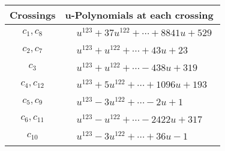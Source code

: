 \documentclass[1p]{elsarticle_modified}
\theoremstyle{definition}
\begin{document}
\begin{tabular}{m{50pt}|m{274pt}}
Crossings & \hspace{64pt}u-Polynomials at each crossing \\
\hline $$\begin{aligned}c_{1},c_{8}\end{aligned}$$&$\begin{aligned}
&u^{123}+37 u^{122}+\cdots+8841 u+529
\end{aligned}$\\
\hline $$\begin{aligned}c_{2},c_{7}\end{aligned}$$&$\begin{aligned}
&u^{123}+u^{122}+\cdots+43 u+23
\end{aligned}$\\
\hline $$\begin{aligned}c_{3}\end{aligned}$$&$\begin{aligned}
&u^{123}+u^{122}+\cdots-438 u+319
\end{aligned}$\\
\hline $$\begin{aligned}c_{4},c_{12}\end{aligned}$$&$\begin{aligned}
&u^{123}+5 u^{122}+\cdots+1096 u+193
\end{aligned}$\\
\hline $$\begin{aligned}c_{5},c_{9}\end{aligned}$$&$\begin{aligned}
&u^{123}-3 u^{122}+\cdots-2 u+1
\end{aligned}$\\
\hline $$\begin{aligned}c_{6},c_{11}\end{aligned}$$&$\begin{aligned}
&u^{123}- u^{122}+\cdots-2422 u+317
\end{aligned}$\\
\hline $$\begin{aligned}c_{10}\end{aligned}$$&$\begin{aligned}
&u^{123}-3 u^{122}+\cdots+36 u-1
\end{aligned}$\\
\hline
\end{tabular}\\~\\
\newpage\renewcommand{\arraystretch}{1}
\end{document}
